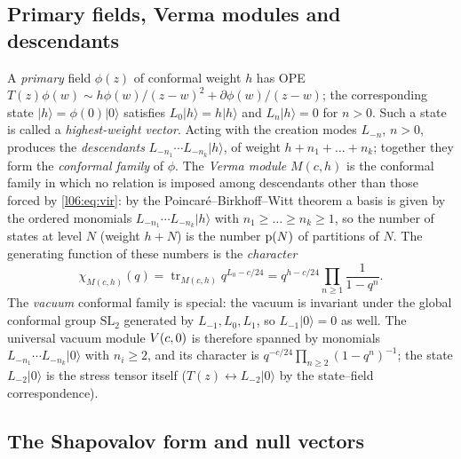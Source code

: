 \subsection{Primary fields, Verma modules and descendants}

A \emph{primary} field $\phi(z)$ of conformal weight $h$ has OPE
$T(z)\phi(w)\sim h\phi(w)/(z-w)^2 + \partial\phi(w)/(z-w)$; the corresponding state
$|h\rangle = \phi(0)|0\rangle$ satisfies $L_0|h\rangle = h|h\rangle$ and $L_n|h\rangle = 0$ for $n>0$.
Such a state is called a \emph{highest-weight vector}. Acting with the creation modes $L_{-n}$, $n>0$,
produces the \emph{descendants} $L_{-n_1}\cdots L_{-n_k}|h\rangle$, of weight $h+n_1+\dots+n_k$; together
they form the \emph{conformal family} of $\phi$. The \emph{Verma module} $M(c,h)$ is the conformal family
in which no relation is imposed among descendants other than those forced by \eqref{l06:eq:vir}: by the
Poincar\'e--Birkhoff--Witt theorem a basis is given by the ordered monomials
$L_{-n_1}\cdots L_{-n_k}|h\rangle$ with $n_1\ge\dots\ge n_k\ge1$, so the number of states at level $N$
(weight $h+N$) is the number $\mathrm{p}(N)$ of partitions of $N$. The generating function of these
numbers is the \emph{character}
\begin{equation*}
 \chi_{M(c,h)}(q) = \operatorname{tr}_{M(c,h)}q^{L_0-c/24} = q^{h-c/24}\prod_{n\ge1}\frac{1}{1-q^n}.
\end{equation*}
The \emph{vacuum} conformal family is special: the vacuum is invariant under the global conformal group
$\mathrm{SL}_2$ generated by $L_{-1},L_0,L_1$, so $L_{-1}|0\rangle = 0$ as well. The universal vacuum
module $V(c,0)$ is therefore spanned by monomials $L_{-n_1}\cdots L_{-n_k}|0\rangle$ with $n_i\ge2$, and its
character is $q^{-c/24}\prod_{n\ge2}(1-q^n)^{-1}$; the state $L_{-2}|0\rangle$ is the stress tensor
itself ($T(z)\leftrightarrow L_{-2}|0\rangle$ by the state--field correspondence).

\subsection{The Shapovalov form and null vectors}

